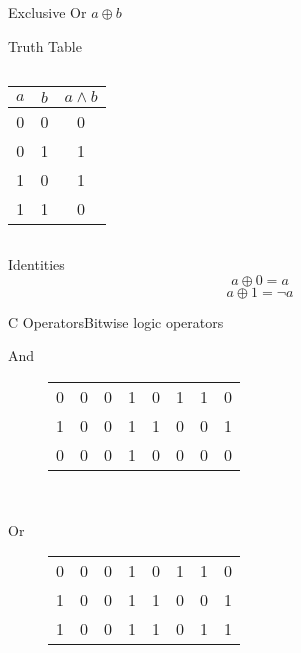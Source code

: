 \documentclass[svgnames,x11names]{beamer}
\begin{document}
\begin{frame}[fragile]{Exclusive Or $a \oplus b$}
  \begin{block}{Truth Table}
    \begin{columns}[onlytextwidth]
      \begin{column}{.3\textwidth}
        \begin{tabular}{cc|c}
          $a$ & $b$ & $a \wedge b$ \\\midrule
          0 & 0 & 0 \\
          0 & 1 & 1 \\
          1 & 0 & 1 \\
          1 & 1 & 0 \\
        \end{tabular}
      \end{column}
      \begin{column}{.5\textwidth}
      \end{column}
  \end{columns}
  \end{block}

  \begin{alertblock}{Identities}
    \[ a \oplus 0 = a \]
    \[ a \oplus 1 = \neg a \]
  \end{alertblock}
\end{frame}


\begin{frame}[fragile]{C Operators}{Bitwise logic operators}
  \begin{description}
  \item[And]  
    \begin{tabular}{cccccccc}
      0&0&0&1&0&1&1&0 \\
      1&0&0&1&1&0&0&1 \\\midrule
      0&0&0&1&0&0&0&0
    \end{tabular}\\[2em]

  \item[Or]  
    \begin{tabular}{cccccccc}
      0&0&0&1&0&1&1&0 \\
      1&0&0&1&1&0&0&1 \\\midrule
      1&0&0&1&1&0&1&1
    \end{tabular}

  \end{description}
  
\end{frame}
\end{document}

